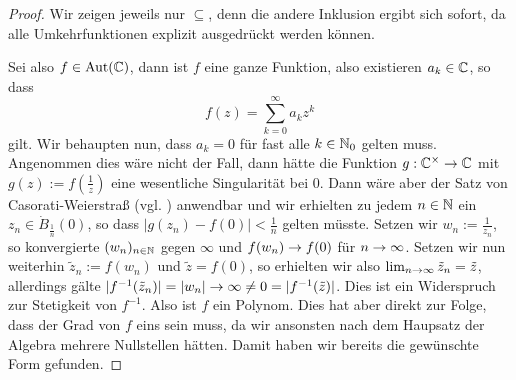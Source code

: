 \begin{proof}
  Wir zeigen jeweils nur $\subseteq$, denn die andere Inklusion ergibt
  sich sofort, da alle Umkehrfunktionen explizit ausgedrückt werden
  können.

  Sei also $f \in \operatorname{Aut}(\mathbb{C})$, dann ist $f$ eine ganze Funktion, also
  existieren $a_k \in \mathbb{C}$, so dass
  \[
  f(z) = \sum_{k=0}^\infty a_k z^k
  \]
  gilt. Wir behaupten nun, dass $a_k = 0$ für fast alle $k \in \mathbb{N}_0$
  gelten muss. Angenommen dies wäre nicht der Fall, dann hätte die
  Funktion $g: \mathbb{C}^\times \rightarrow \mathbb{C}$ mit $g(z) := f(\frac{1}{z})$ eine
  wesentliche Singularität bei $0$. Dann wäre aber der Satz von
  Casorati-Weierstraß (vgl. \cite[Satz 6.11]{Kas}) anwendbar und wir
  erhielten zu jedem $n \in \mathbb{N}$
  ein $z_n \in \dot B_{\frac{1}{n}}(0)$, so dass $|g(z_n) - f(0)| <
  \frac{1}{n}$ gelten müsste. Setzen wir $w_n := \frac{1}{z_n}$, so konvergierte
  $(w_n)_{n \in \mathbb{N}}$ gegen $\infty$ und $f(w_n) \rightarrow f(0)$ für $n \rightarrow
  \infty$. Setzen wir nun weiterhin $\tilde z_n := f(w_n)$ und $\tilde
  z = f(0)$, so erhielten wir also $\lim_{n \rightarrow \infty} \tilde z_n =
  \tilde z$, allerdings gälte $|f^{-1}(\tilde z_n)| = |w_n| \rightarrow \infty
  \neq 0 = |f^{-1}(\tilde z)|$. Dies ist ein Widerspruch zur
  Stetigkeit von $f^{-1}$. Also ist $f$ ein Polynom. Dies hat aber
  direkt zur Folge, dass der Grad von $f$ eins sein muss, da wir
  ansonsten nach dem Haupsatz der Algebra mehrere Nullstellen
  hätten. Damit haben wir bereits die gewünschte Form gefunden.


\end{proof}
